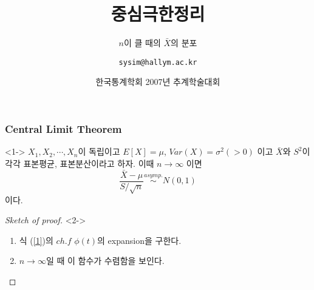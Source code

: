 \documentclass{beamer}
\title{중심극한정리}
\subtitle{$n$이 클 때의 $\bar{X}$의 분포}
\author[심송용]{\texttt{sysim@hallym.ac.kr}}
\date[\today]{한국통계학회 2007년 추계학술대회}
\institute{한림대 통계학과}
\begin{document}

\begin{frame}
\titlepage
\end{frame}

\begin{frame}
\frametitle{Central Limit Theorem}
\begin{theorem}<1->
$X_1, X_2, \cdots, X_n$이 독립이고 $E[X] = \mu$, $Var(X)=\sigma^2 (>0)$ 이고 $\bar{X}$와 $S^2$이 각각 표본평균, 표본분산이라고 하자. 이때 $n \rightarrow \infty$ 이면 
\begin{equation} \label{1}
\frac{\bar{X} - \mu}{S/ \sqrt{n}} \stackrel{asymp.}{\sim}N(0,1)
\end{equation}
이다.
\end{theorem}

\begin{proof}[Sketch of proof]<2->
\begin{enumerate}
\item<3-> 식 (\ref{1})의 $ch.f$ $\phi(t)$의 expansion을 구한다.
\item<4-> $n \rightarrow \infty$일 때 이 함수가 수렴함을 보인다.
\end{enumerate}
\end{proof}
\end{frame}
\end{document}
